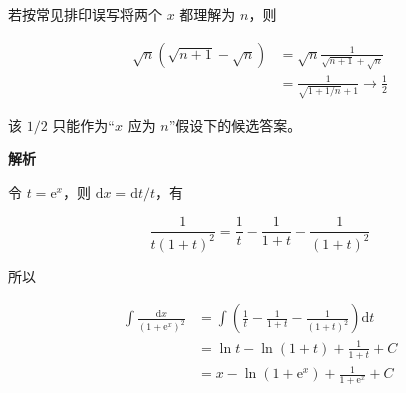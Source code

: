 \begin{answer}
若按常见排印误写将两个 $x$ 都理解为 $n$，则

\nopagebreak[4]
\[
\begin{aligned}
\sqrt n(\sqrt{n+1}-\sqrt n)
&=\sqrt n\frac1{\sqrt{n+1}+\sqrt n}\\
&=\frac1{\sqrt{1+1/n}+1}\longrightarrow\frac12
\end{aligned}
\]

该 $1/2$ 只能作为“$x$ 应为 $n$”假设下的候选答案。


\textbf{解析}

令 $t=\mathrm e^x$，则 $\mathrm dx=\mathrm dt/t$，有

\nopagebreak[4]
\[
\frac1{t(1+t)^2}=\frac1t-\frac1{1+t}-\frac1{(1+t)^2}
\]

所以

\nopagebreak[4]
\[
\begin{aligned}
\int\frac{\mathrm dx}{(1+\mathrm e^x)^2}
&=\int\left(\frac1t-\frac1{1+t}-\frac1{(1+t)^2}\right)\mathrm dt\\
&=\ln t-\ln(1+t)+\frac1{1+t}+C\\
&=x-\ln(1+\mathrm e^x)+\frac1{1+\mathrm e^x}+C
\end{aligned}
\]


\end{answer}
